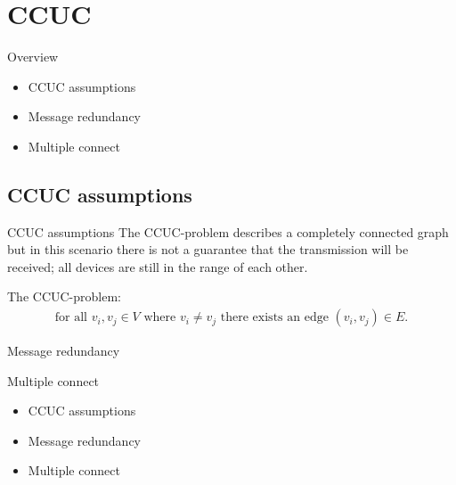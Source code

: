 \section{CCUC}
\begin{frame}{Overview}
  \begin{itemize}
    \item CCUC assumptions
    \item Message redundancy
    \item Multiple connect
  \end{itemize}
\end{frame}
\subsection{CCUC assumptions}
\begin{frame}{CCUC assumptions}
The CCUC-problem describes a completely connected graph but in this scenario there is not a guarantee that the transmission will be received; all devices are still in the range of each other.
\end{frame}

\begin{frame}
\begin{definition}
	The CCUC-problem:
	\begin{align*}
		\text{for all } v_i, v_j \in V \text{ where } v_i \neq v_j \text{ there exists an edge } (v_i, v_j) \in E.
	\end{align*}
\end{definition} 
\end{frame}

\begin{frame}{Message redundancy}

\end{frame}

\begin{frame}{Multiple connect}
  \begin{itemize}
    \item CCUC assumptions
    \item Message redundancy
    \item Multiple connect
  \end{itemize}
\end{frame}